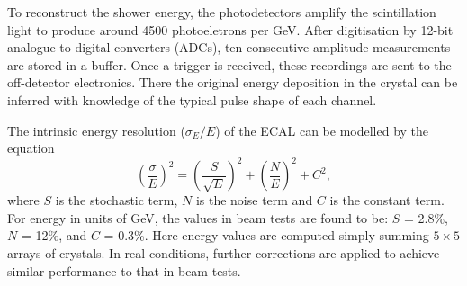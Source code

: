 To reconstruct the shower energy, the photodetectors amplify the scintillation light to produce around 4500 photoeletrons per GeV.
After digitisation by 12-bit analogue-to-digital converters (ADCs), ten consecutive amplitude measurements are stored in a buffer.
Once a trigger is received, these recordings are sent to the off-detector electronics. 
There the original energy deposition in the crystal can be inferred with knowledge of the typical pulse shape of each channel.

The intrinsic energy resolution ($\sigma_E/E$) of the ECAL can be modelled by the equation
\begin{equation}
  \left(\frac{\sigma}{E} \right)^{2} =  
  \left(\frac{S}{\sqrt{E}} \right)^{2} +  
  \left(\frac{N}{E} \right)^{2} +  
  C^{2},
\label{eq:detector_resolution}
\end{equation}
where $S$ is the stochastic term, $N$ is the noise term and $C$ is the constant term.
For energy in units of GeV, the values in beam tests are found to be: %
$S$ = 2.8\%, $N$ = 12\%, and $C$ = 0.3\%.
Here energy values are computed simply summing $5\times5$ arrays of crystals.
In real conditions, further corrections are applied to achieve similar performance to that in beam tests.

